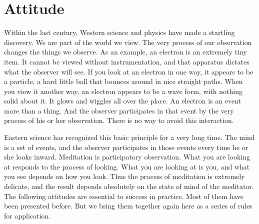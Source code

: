 \chapter{Attitude}
Within the last century, Western science and physics have
made a startling discovery. We are part of the world we view. The very process
of our observation changes the things we observe. As an example, an electron is
an extremely tiny item. It cannot be viewed without instrumentation, and that
apparatus dictates what the observer will see. If you look at an electron in one
way, it appears to be a particle, a hard little ball that bounces around in nice
straight paths. When you view it another way, an electron appears to be a wave
form, with nothing solid about it. It glows and wiggles all over the place. An
electron is an event more than a thing. And the observer participates in that
event by the very process of his or her observation. There is no way to avoid
this interaction.

Eastern science has recognized this basic principle for a very long time. The
mind is a set of events, and the observer participates in those events every
time he or she looks inward. Meditation is participatory observation. What you
are looking at responds to the process of looking. What you are looking at is
you, and what you see depends on how you look. Thus the process of meditation is
extremely delicate, and the result depends absolutely on the state of mind of
the meditator. The following attitudes are essential to success in practice.
Most of them have been presented before. But we bring them together again here
as a series of rules for application.

